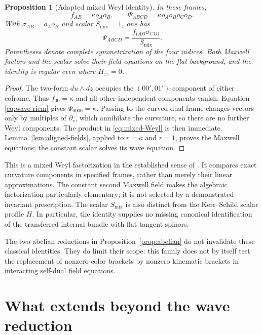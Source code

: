 \documentclass[11pt]{article}
\numberwithin{equation}{section}
\newtheorem{proposition}[theorem]{Proposition}
\theoremstyle{definition}
\theoremstyle{remark}
\begin{document}
\begin{proposition}[Adapted mixed Weyl identity]\label{prop:mixed-Weyl}
In these frames,
\begin{equation}\label{eq:aligned-spinors}
f_{AB}=\kappa o_Ao_B,
\qquad \Psi_{ABCD}=\kappa o_Ao_Bo_Co_D.
\end{equation}
With $\sigma_{AB}=o_Ao_B$ and scalar $S_{\mathrm{mix}}=1$, one has
\begin{equation}\label{eq:mixed-Weyl}
\Psi_{ABCD}=\frac{f_{(AB}\sigma_{CD)}}{S_{\mathrm{mix}}}.
\end{equation}
Parentheses denote complete symmetrization of the four indices. Both Maxwell factors and the scalar solve their field equations on the flat background, and the identity is regular even where $H_{zz}=0$.
\end{proposition}
\begin{proof}
The two-form $du\wedge dz$ occupies the $(00',01')$ component of either coframe. Thus $f_{00}=\kappa$ and all other independent components vanish. Equation \eqref{eq:wave-riem} gives $\Psi_{0000}=\kappa$. Passing to the curved dual frame changes vectors only by multiples of $\partial_v$, which annihilate the curvature, so there are no further Weyl components. The product in \eqref{eq:mixed-Weyl} is then immediate. Lemma~\ref{lem:aligned-fields}, applied to $r=\kappa$ and $r=1$, proves the Maxwell equations; the constant scalar solves its wave equation.
\end{proof}

This is a mixed Weyl factorization in the established sense of \cite{LMNO,CNW}. It compares exact curvature components in specified frames, rather than merely their linear approximations. The constant second Maxwell field makes the algebraic factorization particularly elementary; it is not selected by a demonstrated invariant prescription. The scalar $S_{\mathrm{mix}}$ is also distinct from the Kerr--Schild scalar profile $H$. In particular, the identity supplies no missing canonical identification of the transferred internal bundle with flat tangent spinors.

The two abelian reductions in Proposition~\ref{prop:abelian} do not invalidate these classical identities. They do limit their scope: this family does not by itself test the replacement of nonzero color brackets by nonzero kinematic brackets in interacting self-dual field equations.
\section{What extends beyond the wave reduction}\label{sec:general}
\end{document}
